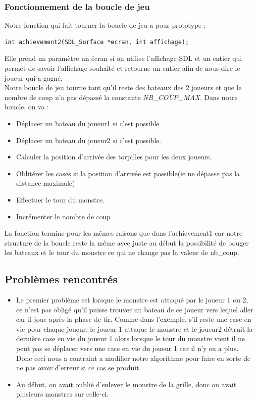 \subsubsection{Fonctionnement de la boucle de jeu}
Notre fonction qui fait tourner la boucle de jeu a pour prototype :
\begin{lstlisting}
int achievement2(SDL_Surface *ecran, int affichage);
\end{lstlisting}
Elle prend un paramètre un écran si on utilise l'affichage SDL et un entier qui permet de savoir l'affichage souhaité et retourne un entier afin de nous dire le joueur qui a gagné.\\
Notre boucle de jeu tourne tant qu'il reste des bateaux des 2 joueurs et que le nombre de coup n'a pas dépassé la constante {\textit{NB\_COUP\_MAX}}. Dans notre boucle, on va :
\begin{itemize}
\item Déplacer un bateau du joueur1 si c'est possible.
\item Déplacer un bateau du joueur2 si c'est possible.
\item Calculer la position d'arrivée des torpilles pour les deux joueurs.
\item Oblitérer les cases si la position d'arrivée est possible(ie ne dépasse pas la distance maximale)
\item Effectuer le tour du monstre.
\item Incrémenter le nombre de coup
\end{itemize}
La fonction termine pour les mêmes raisons que dans l'achievement1 car notre structure de la boucle reste la même avec juste au début la possibilité de bouger les bateaux et le tour du monstre ce qui ne change pas la valeur de nb\_coup.
\subsection{Problèmes rencontrés}
\begin{itemize}
\item Le premier problème est lorsque le monstre est attaqué par le joueur 1 ou 2, ce n'est pas obligé qu'il puisse trouver un bateau de ce joueur vers lequel aller car il joue après la phase de tir. Comme dans l'exemple, s'il reste une case en vie pour chaque joueur, le joueur 1 attaque le monstre et le joueur2 détruit la dernière case en vie du joueur 1 alors lorsque le tour du monstre vient il ne peut pas se déplacer vers une case en vie du joueur 1 car il n'y en a plus. Donc ceci nous a contraint a modifier notre algorithme pour faire en sorte de ne pas avoir d'erreur si ce cas se produit.\\
\item Au début, on avait oublié d'enlever le monstre de la grille, donc on avait plusieurs monstres sur celle-ci.
\end{itemize}

